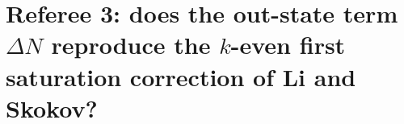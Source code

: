\providecommand{\dref}[1]{\texttt{\detokenize{#1}}}
\providecommand{\Kv}{\mathcal K}
\def\v#1{\mathbf{#1}}%
\section{Referee 3: does the out-state term $\Delta N$ reproduce the $k$-even first saturation correction of Li and Skokov?}\label{sec:ref3ls}

